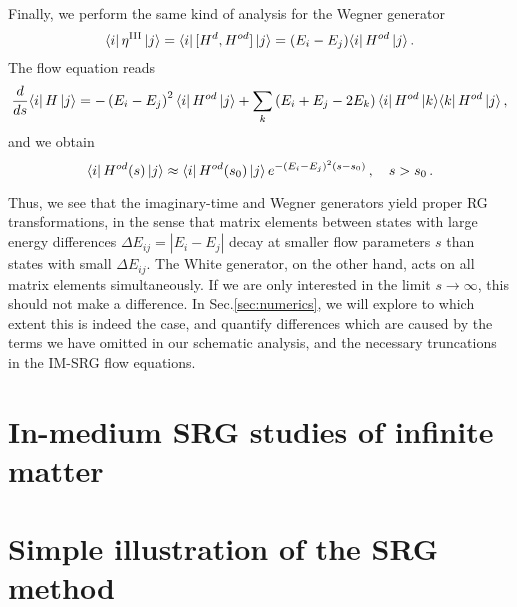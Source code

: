 Finally, we perform the same kind of analysis for the Wegner generator
\begin{equation}
  \langle{i}|\,{\eta^\text{III}}\,|{j}\rangle=\langle{i}|\,{[{H^d},{H^{od}}]}\,|{j}\rangle=(E_i-E_j)\langle{i}|\,{H^{od}}\,|{j}\rangle\,.
\end{equation}
The flow equation reads
\begin{align}
  \totd{}{s}\matrixe{i}{\HO}{j}
  =-\left(E_i-E_j\right)^2\matrixe{i}{\HO^{od}}{j}
  +\sum_k\left(E_i+E_j-2E_k\right)\matrixe{i}{\HO^{od}}{k}\matrixe{k}{\HO^{od}}{j}\,,\label{eq:schema_wegner}
\end{align}
and we obtain
\begin{equation}
  \langle{i}|\,{H^{od}(s)}\,|{j}\rangle \approx \langle{i}|\,{H^{od}(s_0)}\,|{j}\rangle\,e^{-(E_i-E_j)^2 (s-s_0)}\,, \quad s>s_0\,.
\end{equation}

Thus, we see that the imaginary-time and Wegner generators yield
proper RG transformations, in the sense that matrix elements between
states with large energy differences $\Delta E_{ij} = |E_i-E_j|$ decay
at smaller flow parameters $s$ than states with small $\Delta
E_{ij}$. The White generator, on the other hand, acts on all matrix
elements simultaneously. If we are only interested in the limit
$s\to\infty$, this should not make a difference. In
Sec.\ref{sec:numerics}, we will explore to which extent this is indeed
the case, and quantify differences which are caused by the terms we
have omitted in our schematic analysis, and the necessary truncations
in the IM-SRG flow equations.


\section{In-medium SRG studies of infinite matter}

\begin{acknowledgement}

\end{acknowledgement}



\section*{Simple illustration of the SRG method}

